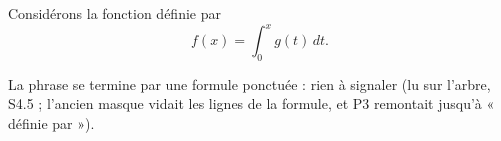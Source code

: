 Considérons la fonction définie par
\[
  f(x) = \int_0^x g(t) \, dt.
\]
\begin{proposition}
  La phrase se termine par une formule ponctuée : rien à signaler (lu sur
  l'arbre, S4.5 ; l'ancien masque vidait les lignes de la formule, et P3
  remontait jusqu'à « définie par »).
\end{proposition}
